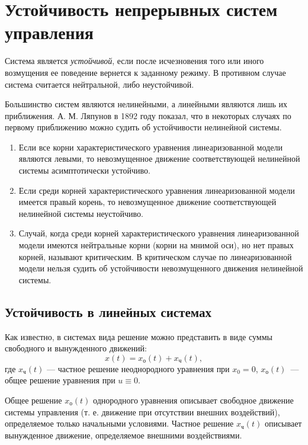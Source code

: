 \documentclass[../../TAU.tex]{subfiles}
\begin{document}
\chapter{Устойчивость непрерывных систем управления}

     Система является {\it устойчивой}, если после исчезновения того или иного возмущения ее поведение вернется к заданному режиму. В противном случае система считается нейтральной, либо неустойчивой. \par
    Большинство систем являются нелинейными, а линейными являются лишь их приближения. А. М. Ляпунов в 1892 году показал, что в некоторых случаях по первому приближению можно судить об устойчивости нелинейной системы.

    \begin{enumerate}
        \item Если все корни характеристического уравнения линеаризованной модели являются левыми, то невозмущенное движение соответствующей нелинейной системы асимптотически устойчиво.
        \item Если среди корней характеристического уравнения линеаризованной модели имеется правый корень, то невозмущенное движение соответствующей нелинейной системы неустойчиво.
        \item Случай, когда среди корней характеристического уравнения линеаризованной модели имеются нейтральные корни (корни на мнимой оси), но нет правых корней, называют критическим. В критическом случае по линеаризованной модели нельзя судить об устойчивости невозмущенного движения нелинейной системы. 

    \end{enumerate}

\section{Устойчивость в линейных системах}

    \normalfont
    Как известно, в системах вида
    решение можно представить в виде суммы свободного и вынужденного движений:
    $$
        x(t) = x_\text{о}(t) + x_\text{ч}(t),
    $$
    где $x_\text{ч}(t)$ --- частное решение неоднородного уравнения при 
    $x_0 = 0$, $x_\text{о}(t)$~--- общее решение уравнения при 
    $u\equiv0$.
    \par
    Общее решение $x_\text{о}(t)$ однородного уравнения описывает свободное движение системы управления (т. е. движение при отсутствии внешних воздействий), определяемое только начальными условиями. Частное решение $x_\text{ч}(t)$ описывает вынужденное движение, определяемое внешними воздействиями.
\end{document}
